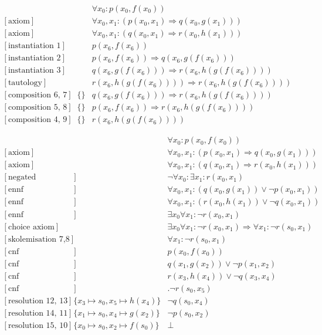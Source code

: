 \documentclass[onehalfspacing]{article}
\begin{document}
\setcounter{equation}{0}
\begin{align}
	[\text{axiom}] && \forall x_0: p(x_0,f(x_0))\\
	[\text{axiom}] && \forall x_0, x_1 : (p(x_0,x_1) \Rightarrow q(x_0,g(x_1)))\\
	[\text{axiom}] && \forall x_0, x_1 : (q(x_0,x_1) \Rightarrow r(x_0,h(x_1)))\\
	[\text{instantiation 1}] && p(x_6, f(x_6))\\
	[\text{instantiation 2}] && p(x_6, f(x_6))\Rightarrow q(x_6,g(f(x_6))) \\
	[\text{instantiation 3}] && q(x_6, g(f(x_6)))\Rightarrow r(x_6,h(g(f(x_6)))) \\
	[\text{tautology}] && r(x_6, h(g(f(x_6))))\Rightarrow r(x_6,h(g(f(x_6))))\\
	[\text{composition 6, 7}] &\{\}&q(x_6, g(f(x_6)))\Rightarrow r(x_6,h(g(f(x_6))))\\
	[\text{composition 5, 8}] &\{\}&p(x_6,f(x_6))\Rightarrow r(x_6, h(g(f(x_6))))\\
	[\text{composition 4, 9}] &\{\}&r(x_6, h(g(f(x_6))))
\end{align}

\pagebreak

\setcounter{equation}{0}
\begin{align}
	[\text{axiom}] && \forall x_0: p(x_0,f(x_0))\\
	[\text{axiom}] && \forall x_0, x_1 : (p(x_0,x_1) \Rightarrow q(x_0,g(x_1)))\\
	[\text{axiom}] && \forall x_0, x_1 : (q(x_0,x_1) \Rightarrow r(x_0,h(x_1)))\\
	[\text{negated conjecture}] &&\neg\forall  x_0 : \exists x_1 : r(x_0,x_1)\\
	[\text{ennf transformation 2}] && \forall x_0, x_1 : (q(x_0,g(x_1)) \vee \neg p(x_0,x_1)) \\
	[\text{ennf transformation 3}] &&\forall x_0, x_1 : (r(x_0,h(x_1)) \vee \neg q(x_0, x_1)) \\
	[\text{ennf transformation 4}] && \exists x_0 \forall x_1 : \neg r(x_0, x_1)\\
	[\text{choice axiom}] && \exists x_0 \forall x_1 : \neg r(x_0, x_1) \Rightarrow \forall x_1 : \neg r(s_0,x_1)\\
	[\text{skolemisation 7,8}] && \forall x_1 : \neg r(s_0, x_1)\\
	[\text{cnf transformation 1}] && p(x_0,f(x_0))\\
	[\text{cnf transformation 5}] && q(x_1,g(x_2)) \vee \neg p(x_1, x_2)\\
	[\text{cnf transformation 6}] && r(x_3,h(x_4)) \vee \neg q(x_3, x_4)\\
	[\text{cnf transformation 9}] &&. \neg r(s_0,x_5)\\
	[\text{resolution 12, 13}] &\{x_3\mapsto s_0, x_5\mapsto h(x_4)\}& \neg q(s_0,x_4)\\
	[\text{resolution 14, 11}] &\{x_1\mapsto s_0, x_4\mapsto g(x_2)\}&\neg p(s_0,x_2)\\
	[\text{resolution 15, 10}] &\{x_0\mapsto s_0, x_2\mapsto f(s_0)\}& \bot
\end{align}
\end{document}
